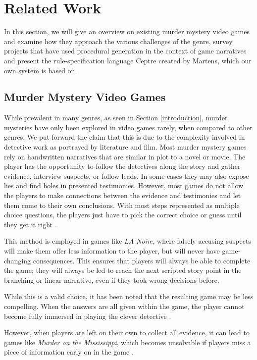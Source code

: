 \section{Related Work} \label{related_work}

In this section, we will give an overview on existing murder mystery video games and examine how they approach the various challenges of the genre, survey projects that have used procedural generation in the context of game narratives and present the rule-specification language Ceptre created by Martens, which our own system is based on.

\subsection{Murder Mystery Video Games}

While prevalent in many genres, as seen in Section \ref{introduction}, murder mysteries have only been explored in video games rarely, when compared to other genres.
We put forward the claim that this is due to the complexity involved in detective work as portrayed by literature and film.
Most murder mystery games rely on handwritten narratives that are similar in plot to a novel or movie.
The player has the opportunity to follow the detectives along the story and gather evidence, interview suspects, or follow leads.
In some cases they may also expose lies and find holes in presented testimonies.
However, most games do not allow the players to make connections between the evidence and testimonies and let them come to their own conclusions. With most steps represented as multiple choice questions, the players just have to pick the correct choice or guess until they get it right \cite{brown_2017}. 

This method is employed in games like \emph{LA Noire}, where falsely accusing suspects will make them offer less information to the player, but will never have game-changing consequences.
This ensures that players will always be able to complete the game; they will always be led to reach the next scripted story point in the branching or linear narrative, even if they took wrong decisions before.

While this is a valid choice, it has been noted that the resulting game may be less compelling.
When the answers are all given within the game, the player cannot become fully immersed in playing the clever detective \cite{goldstein_2018}.

However, when players are left on their own to collect all evidence, it can lead to games like \emph{Murder on the Mississippi}, which becomes unsolvable if players miss a piece of information early on in the game \cite{petit_2018}.

